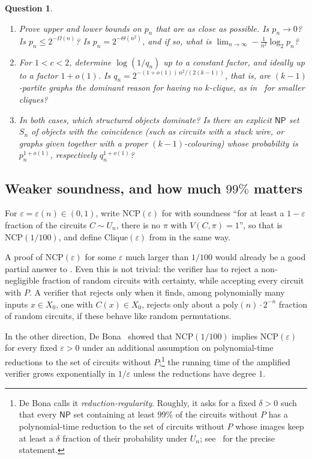 \documentclass[11pt]{article}
\newtheorem{question}{Question}
\theoremstyle{remark}
\newcommand{\NP}{\mathsf{NP}}
\begin{document}
\begin{question}\label{q:rarity}
\begin{enumerate}
\item Prove upper and lower bounds on $p_n$ that are as close as possible. Is $p_n \to 0$? Is $p_n \leq 2^{-\Omega(n)}$? Is $p_n = 2^{-\Theta(n^2)}$, and if so, what is $\lim_{n \to \infty} -\frac{1}{n^2} \log_2 p_n$?
\item For $1 < c < 2$, determine $\log(1/q_n)$ up to a constant factor, and ideally up to a factor $1 + o(1)$. Is $q_n = 2^{-(1 + o(1))\, n^2/(2(k-1))}$, that is, are $(k-1)$-partite graphs the dominant reason for having no $k$-clique, as in~\cite{bbclms} for smaller cliques?
\item In both cases, which structured objects dominate? Is there an explicit $\NP$ set $S_n$ of objects with the coincidence (such as circuits with a stuck wire, or graphs given together with a proper $(k-1)$-colouring) whose probability is $p_n^{1 + o(1)}$, respectively $q_n^{1 + o(1)}$?
\end{enumerate}
\end{question}

\subsection*{Weaker soundness, and how much $99\%$ matters}

For $\varepsilon = \varepsilon(n) \in (0, 1)$, write $\mathrm{NCP}(\varepsilon)$ for  with soundness ``for at least a $1 - \varepsilon$ fraction of the circuits $C \sim U_n$, there is no $\pi$ with $V(C, \pi) = 1$'', so that  is $\mathrm{NCP}(1/100)$, and define $\mathrm{Clique}(\varepsilon)$ from  in the same way.

A proof of $\mathrm{NCP}(\varepsilon)$ for some $\varepsilon$ much larger than $1/100$ would already be a good partial answer to . Even this is not trivial: the verifier has to reject a non-negligible fraction of random circuits with certainty, while accepting every circuit with $P$. A verifier that rejects only when it finds, among polynomially many inputs $x \in X_0$, one with $C(x) \in X_0$, rejects only about a $\mathrm{poly}(n) \cdot 2^{-n}$ fraction of random circuits, if these behave like random permutations.

In the other direction, De Bona~\cite{debona2025} showed that $\mathrm{NCP}(1/100)$ implies $\mathrm{NCP}(\varepsilon)$ for every fixed $\varepsilon > 0$ under an additional assumption on polynomial-time reductions to the set of circuits without $P$;\footnote{De Bona calls it \emph{reduction-regularity}. Roughly, it asks for a fixed $\delta > 0$ such that every $\NP$ set containing at least $99\%$ of the circuits without $P$ has a polynomial-time reduction to the set of circuits without $P$ whose images keep at least a $\delta$ fraction of their probability under $U_n$; see~\cite{debona2025} for the precise statement.} the running time of the amplified verifier grows exponentially in $1/\varepsilon$ unless the reductions have degree $1$.
\end{document}

